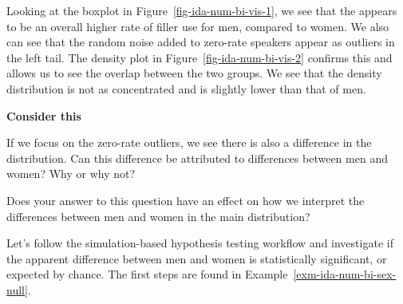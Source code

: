 \documentclass[
  letterpaper,
  DIV=11,
  numbers=noendperiod]{scrreprt}
\theoremstyle{definition}
\theoremstyle{remark}
\begin{document}
Looking at the boxplot in Figure~\ref{fig-ida-num-bi-vis-1}, we see that
the appears to be an overall higher rate of filler use for men, compared
to women. We also can see that the random noise added to zero-rate
speakers appear as outliers in the left tail. The density plot in
Figure~\ref{fig-ida-num-bi-vis-2} confirms this and allows us to see the
overlap between the two groups. We see that the density distribution is
not as concentrated and is slightly lower than that of men.

\begin{tcolorbox}[enhanced jigsaw, leftrule=.75mm, colframe=quarto-callout-color-frame, colback=white, rightrule=.15mm, opacityback=0, arc=.35mm, breakable, bottomrule=.15mm, left=2mm, toprule=.15mm]

\textbf{Consider this}

If we focus on the zero-rate outliers, we see there is also a difference
in the distribution. Can this difference be attributed to differences
between men and women? Why or why not?

Does your answer to this question have an effect on how we interpret the
differences between men and women in the main distribution?

\end{tcolorbox}

Let's follow the simulation-based hypothesis testing workflow and
investigate if the apparent difference between men and women is
statistically significant, or expected by chance. The first steps are
found in Example~\ref{exm-ida-num-bi-sex-null}.
\end{document}
